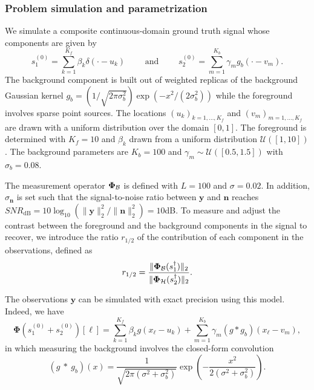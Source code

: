         \subsubsection{Problem simulation and parametrization}

            We simulate a composite continuous-domain ground truth signal whose components are given by 
            $$s_1^{(0)} = \sum_{k=1}^{K_f} \beta_ k \delta(\cdot - u_k) \qquad\text{ and }\qquad s_2^{(0)} = \sum_{m=1}^{K_b} \gamma_m g_b(\cdot - v_m).
            $$
            The background component is built out of weighted replicas of the background Gaussian kernel $g_b = (1/\sqrt{2\pi\sigma_b^2}) \exp{(-x^2/(2 \sigma_b^2))}$ while the foreground involves sparse point sources. The locations $(u_k)_{k=1, \dots, K_f}$ and $(v_m)_{m=1, \dots, K_f}$ are drawn with a uniform distribution over the domain $[0, 1]$. The foreground is determined with $K_f = 10$ and $\beta_k$ drawn from a uniform distribution $\mathcal{U}([1, 10])$. The background parameters are $K_b = 100$ and $\gamma_m \sim \mathcal{U}([0.5, 1.5])$ with $\sigma_b = 0.08$.
            
            The measurement operator ${\bm{\Phi}_\mathcal{B}}$ is defined with $L=100$ and $\sigma=0.02$. In addition, $\sigma_{\bm{n}}$ is set such that the signal-to-noise ratio between $\bm{y}$ and $\bm{n}$ reaches $SNR_\mathrm{dB} = 10 \log_{10}\left({\lVert \bm{y} \rVert_2^2}/{\lVert \bm{n} \rVert_2^2}\right) = 10$dB. To measure and adjust the contrast between the foreground and the background components in the signal to recover, we introduce the ratio $r_{1/2}$ of the contribution of each component in the observations, defined as
            \begin{equation}
                r_{1/2} = \frac{\lVert {\bm{\Phi}_\mathcal{B}} (s_1^\dagger) \rVert_2 }{\lVert {\bm{\Phi}_\mathcal{H}} (s_2^\dagger) \rVert_2 }.
            \end{equation}
    
            The observations $\bm{y}$ can be simulated with exact precision using this model. Indeed, we have
            $$
            \bm{\Phi}(s_1^{(0)} + s_2^{(0)})[\ell] = \sum_{k=1}^{K_f} \beta_k g(x_\ell - u_k) + \sum_{m=1}^{K_b} \gamma_m (g * g_b)(x_\ell - v_m),
            $$
            in which measuring the background involves the closed-form convolution
            $$
            (g\ *\ g_b)(x) = \frac{1}{\sqrt{2 \pi(\sigma^2 + \sigma_b^2)}} \exp{\left(-\frac{x^2}{2 (\sigma^2 + \sigma_b^2)}\right)}.
            $$
            
